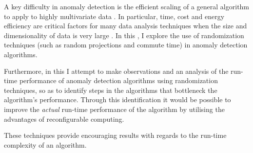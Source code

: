 A key difficulty in anomaly detection is the efficient scaling of a general
algorithm to apply to highly multivariate data \citeNeeded{}. In particular,
time, cost and energy efficiency are critical factors for many data analysis
techniques when the size and dimensionality of data is very large
\cite{Vries:2010}. In this \thesis{}, I explore the use of randomization
techniques (such as random projections and commute time) in anomaly detection
algorithms.

Furthermore, in this \thesis{} I attempt to make observations and an analysis of
the run-time performance of anomaly detection algorithms using randomization
techniques, so as to identify steps in the algorithms that bottleneck the
algorithm's performance. Through this identification it would be possible to
improve the \emph{actual} run-time performance of the algorithm by utilising the
advantages of reconfigurable computing.

These techniques provide encouraging results with regards to the run-time
complexity of an algorithm.